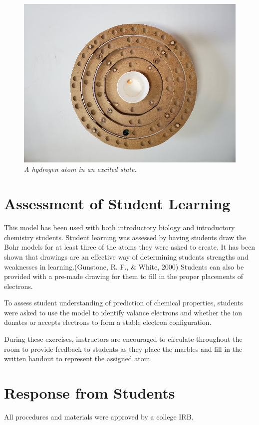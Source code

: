 \documentclass[11pt]{sig-alternate}
\begin{document}
\begin{large}
\begin{figure}[h!]
    \centering
    \includegraphics[width=\columnwidth]{figure 5.png}
    \captionsetup{font=large, labelfont=it}
    \caption{\textit{A hydrogen atom in an excited state.}}
    \label{Figure 5}
\end{figure}

\section*{Assessment of Student Learning}
This model has been used with both introductory biology and introductory chemistry students. Student learning was assessed by having students draw the Bohr models for at least three of the atoms they were asked to create. It has been shown that drawings are an effective way of determining students strengths and weaknesses in learning.(Gunstone, R. F., \& White, 2000) Students can also be provided with a pre-made drawing for them to fill in the proper placements of electrons.

To assess student understanding of prediction of chemical properties, students were asked to use the model to identify valance electrons and whether the ion donates or accepts electrons to form a stable electron configuration.

During these exercises, instructors are encouraged to circulate throughout the room to provide feedback to students as they place the marbles and fill in the written handout to represent the assigned atom.

\section*{Response from Students}
All procedures and materials were approved by a college IRB.


\end{large}
\end{document}
